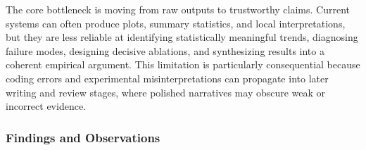 \documentclass{llmxive}
\begin{document}
The core bottleneck is moving from raw outputs to trustworthy claims. Current systems can often produce plots, summary statistics, and local interpretations, but they are less reliable at identifying statistically meaningful trends, diagnosing failure modes, designing decisive ablations, and synthesizing results into a coherent empirical argument. This limitation is particularly consequential because coding errors and experimental misinterpretations can propagate into later writing and review stages, where polished narratives may obscure weak or incorrect evidence.



\subsubsection{Findings and Observations}
\label{sec:s3_findings}
\end{document}
